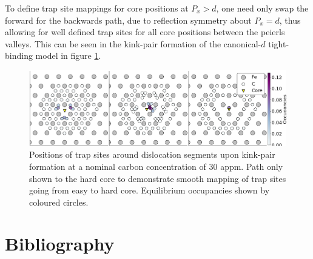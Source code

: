 \documentclass[a4paper,11pt]{article}
\begin{document}
To define trap site mappings for core positions at \(P_x > d\), one need only
swap the forward for the backwards path, due to reflection symmetry about
\(P_x = d\), thus allowing for well defined trap sites for all core positions
between the peierls valleys. This can be seen in the kink-pair formation of
the canonical-\(d\) tight-binding model in figure \ref{fig:kpoccupancies}.

\begin{figure}[htbp]
\centering
\includegraphics[width=1.\textwidth]{Images/mclean_position_movement_occupancy_forward_alternate.png}
\caption{Positions of trap sites around dislocation segments upon kink-pair formation at a nominal carbon concentration of 30 appm. Path only shown to the hard core to demonstrate smooth mapping of trap sites going from easy to hard core. Equilibrium occupancies shown by coloured circles. \label{fig:kpoccupancies}}
\end{figure}

\section{Bibliography}
\label{sec:org1739d83}
\label{org2893c4c}




\end{document}
